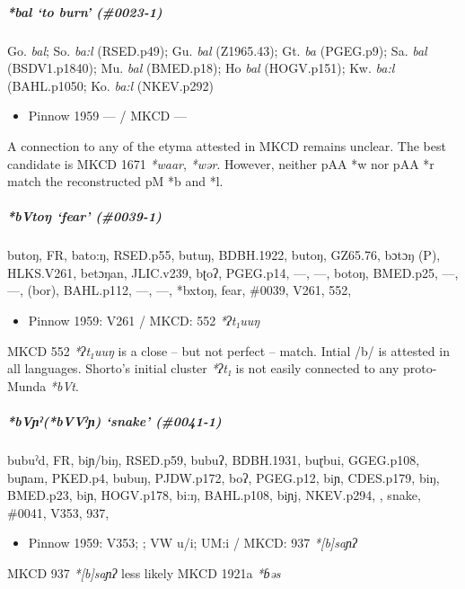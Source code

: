 \documentclass[a4paper,]{article}
\providecommand{\tightlist}{%
  \setlength{\itemsep}{0pt}\setlength{\parskip}{0pt}}
\let\oldsubparagraph\subparagraph
\renewcommand{\subparagraph}[1]{\oldsubparagraph{#1}\mbox{}}
\begin{document}
\subparagraph{\texorpdfstring{\emph{*bal} `to burn'
(\#0023-1)}{*bal to burn (\#0023-1)}}\label{bal-to-burn-0023-1}

Go. \emph{bal}; So. \emph{ba:l} (RSED.p49); Gu. \emph{bal} (Z1965.43);
Gt. \emph{ba} (PGEG.p9); Sa. \emph{bal} (BSDV1.p1840); Mu. \emph{bal}
(BMED.p18); Ho \emph{bal} (HOGV.p151); Kw. \emph{ba:l} (BAHL.p1050; Ko.
\emph{ba:l} (NKEV.p292)

\begin{itemize}
\tightlist
\item
  Pinnow 1959 --- / MKCD ---
\end{itemize}

A connection to any of the etyma attested in MKCD remains unclear. The
best candidate is MKCD 1671 \emph{*waar}, \emph{*wər}. However, neither
pAA *w nor pAA *r match the reconstructed pM *b and *l.

\subparagraph{\texorpdfstring{\emph{*bVtoŋ} `fear'
(\#0039-1)}{*bVtoŋ fear (\#0039-1)}}\label{bvtoux14b-fear-0039-1}

butoŋ, FR, bato:ŋ, RSED.p55, butuŋ, BDBH.1922, butoŋ, GZ65.76, bɔtɔŋ
(P), HLKS.V261, betɔŋan, JLIC.v239, bʈoʔ, PGEG.p14, ---, ---, botoŋ,
BMED.p25, ---, ---, (bor), BAHL.p112, ---, ---, *bxtoŋ, fear, \#0039,
V261, 552,

\begin{itemize}
\tightlist
\item
  Pinnow 1959: V261 / MKCD: 552 \emph{*ʔt₁uuŋ}
\end{itemize}

MKCD 552 \emph{*ʔt₁uuŋ} is a close -- but not perfect -- match. Intial
/b/ is attested in all languages. Shorto's initial cluster \emph{*ʔt₁}
is not easily connected to any proto-Munda \emph{*bVt}.

\subparagraph{\texorpdfstring{\emph{*bVɲˀ(*bVVˀɲ)} `snake'
(\#0041-1)}{*bVɲˀ(*bVVˀɲ) snake (\#0041-1)}}\label{bvux272ux2c0bvvux2c0ux272-snake-0041-1}

bubuˀd, FR, biɲ/biŋ, RSED.p59, bubuʔ, BDBH.1931, buɽbui, GGEG.p108,
buɲam, PKED.p4, bubuŋ, PJDW.p172, boʔ, PGEG.p12, biɲ, CDES.p179, biŋ,
BMED.p23, biɲ, HOGV.p178, bi:ŋ, BAHL.p108, biɲj, NKEV.p294, , snake,
\#0041, V353, 937,

\begin{itemize}
\tightlist
\item
  Pinnow 1959: V353; ; VW u/i; UM:i / MKCD: 937 \emph{*{[}b{]}saɲʔ}
\end{itemize}

MKCD 937 \emph{*{[}b{]}saɲʔ} less likely MKCD 1921a \emph{*ɓəs}
\end{document}

